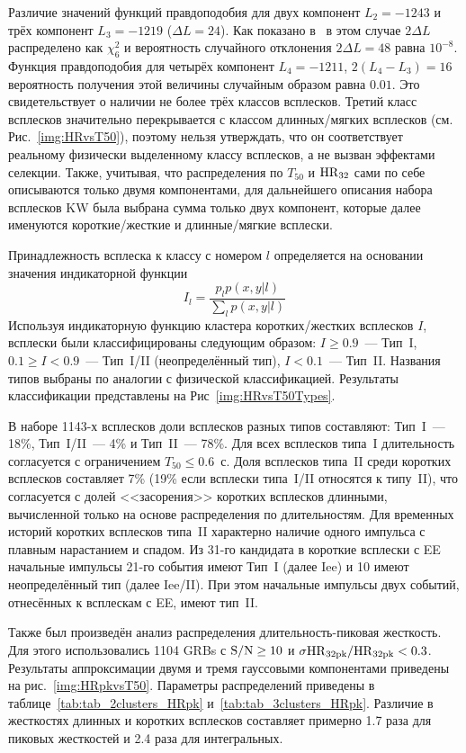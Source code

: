 Различие значений функций правдоподобия для двух компонент $L_2 = -1243$ и трёх 
компонент $L_3 = -1219$ ($\Delta L = 24$). Как показано в~\citep{Horvath_2006} 
в этом случае $2\Delta L$ распределено как $\chi^2_6$ и вероятность случайного 
отклонения $2\Delta L = 48$ равна $10^{-8}$. Функция правдоподобия для четырёх 
компонент $L_4 = -1211$, $2(L_4 - L_3) = 16$ вероятность получения этой величины случайным образом равна $0.01$. 
Это свидетельствует о наличии не более трёх классов всплесков. Третий класс всплесков 
значительно перекрывается с классом длинных/мягких всплесков (см. Рис.~\ref{img:HRvsT50}), поэтому нельзя утверждать, 
что он соответствует реальному физически выделенному классу всплесков, а не вызван эффектами селекции. 
Также, учитывая, что распределения по $T_{50}$ и ${\mathrm{HR}}_{32}$ сами по себе описываются 
только двумя компонентами, для дальнейшего описания набора всплесков KW была выбрана
сумма только двух компонент, которые далее именуются короткие/жесткие и длинные/мягкие всплески.

Принадлежность всплеска к классу с номером $l$ определяется на основании значения индикаторной функции
\begin{equation}
I_l =\frac{p_l p(x,y|l)}{\sum_l  p(x, y|l)}
\end{equation}
Используя индикаторную функцию кластера коротких/жестких всплесков $I$, 
всплески были классифицированы следующим образом: 
$I \geq 0.9$~--- Тип~I, $0.1 \geq I < 0.9$~--- Тип~I/II (неопределённый тип), 
$I < 0.1$~--- Тип~II. Названия типов выбраны по аналогии с физической классификацией. 
Результаты классификации представлены на Рис~\ref{img:HRvsT50Types}.

В наборе 1143-х всплесков доли всплесков разных типов составляют: Тип~I~--- 18\%,
Тип~I/II~--- 4\% и Тип~II~--- 78\%. Для всех всплесков типа~I длительность согласуется 
с ограничением $T_{50} \leq 0.6$~с. Доля всплесков типа~II среди коротких всплесков 
составляет 7\% (19\% если всплески типа~I/II относятся к типу~II), что согласуется с долей
<<засорения>> коротких всплесков длинными, вычисленной только на основе распределения 
по длительностям. Для временных историй коротких всплесков типа~II характерно 
наличие одного импульса с плавным нарастанием и спадом.
Из 31-го кандидата в короткие всплески с EE начальные импульсы 21-го события 
имеют Тип~I (далее Iee) и 10 имеют неопределённый тип (далее Iee/II).
При этом начальные импульсы двух событий, отнесённых к всплескам с EE, имеют тип~II.   %

Также был произведён анализ распределения длительность-пиковая жесткость. 
Для этого использовались 1104 GRBs с ${\mathrm{S/N}} \geq 10$ и $\sigma {\mathrm{HR}}_{32{\mathrm{pk}}}/{\mathrm{HR}}_{32{\mathrm{pk}}} <0.3$. 
Результаты аппроксимации двумя и тремя гауссовыми компонентами приведены на рис.~\ref{img:HRpkvsT50}. 
Параметры распределений приведены в таблице~\ref{tab:tab_2clusters_HRpk} и~\ref{tab:tab_3clusters_HRpk}. 
Различие в жесткостях длинных и коротких всплесков составляет примерно 1.7 раза для пиковых 
жесткостей и 2.4 раза для интегральных. 

